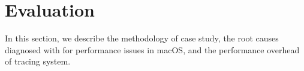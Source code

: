 \section{Evaluation}\label{sec:eval}

In this section, we describe the methodology of case study, the root causes
diagnosed with \xxx for performance issues in macOS,  and the performance
overhead of \xxx tracing system.






